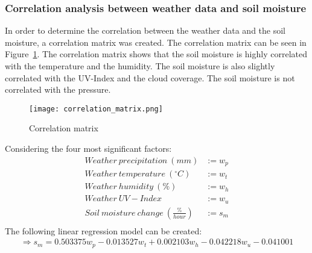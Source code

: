 \documentclass[11pt]{scrartcl} %
\begin{document}
\subsubsection{Correlation analysis between weather data and soil moisture}
In order to determine the correlation between the weather data and the soil moisture, a correlation matrix was created. The correlation matrix can be seen in Figure~\ref{fig:correlation_matrix}. The correlation matrix shows that the soil moisture is highly correlated with the temperature and the humidity. The soil moisture is also slightly correlated with the UV-Index and the cloud coverage. The soil moisture is not correlated with the pressure.
\begin{figure}[H]
	\centering
	\texttt{[image: correlation\_matrix.png]}
	\caption{Correlation matrix}
	\label{fig:correlation_matrix}
\end{figure}
Considering the four most significant factors:
\begin{equation*}
	\begin{aligned}
		Weather\ precipitation\ (mm)              & := w_p \\
		Weather\ temperature\ (^{\circ} C)        & := w_t \\
		Weather\ humidity\ (\%)                   & := w_h \\
		Weather\ UV-Index                         & := w_u \\
		Soil\ moisture\ change\ (\frac{\%}{hour}) & := s_m \\
	\end{aligned}
\end{equation*}
The following linear regression model can be created:
\begin{equation*}
	\begin{aligned}
		\Rightarrow s_m = 0.503375w_p -0.013527w_t + 0.002103w_h -0.042218w_u -0.041001
	\end{aligned}
\end{equation*}
\end{document}
